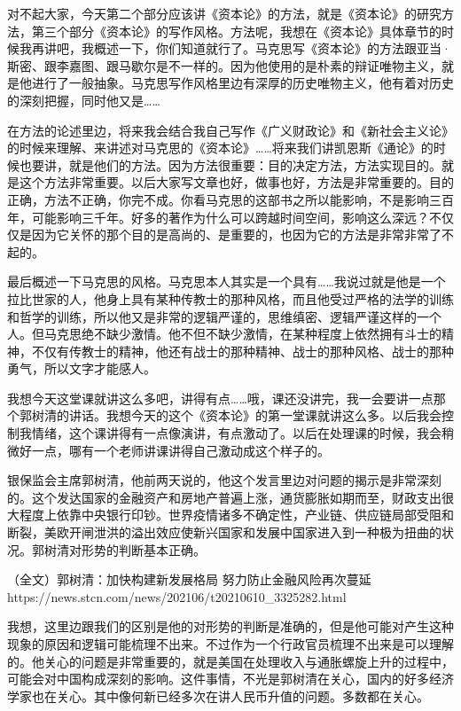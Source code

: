 \documentclass[UTF8, 12pt, a4paper]{ctexrep}
\begin{document}
对不起大家，今天第二个部分应该讲《资本论》的方法，就是《资本论》的研究方法，第三个部分《资本论》的写作风格。方法呢，我想在《资本论》具体章节的时候我再讲吧，我概述一下，你们知道就行了。马克思写《资本论》的方法跟亚当·斯密、跟李嘉图、跟马歇尔是不一样的。因为他使用的是朴素的辩证唯物主义，就是他进行了一般抽象。马克思写作风格里边有深厚的历史唯物主义，他有着对历史的深刻把握，同时他又是……

在方法的论述里边，将来我会结合我自己写作《广义财政论》和《新社会主义论》的时候来理解、来讲述对马克思的《资本论》……将来我们讲凯恩斯《通论》的时候也要讲，就是他们的方法。因为方法很重要：目的决定方法，方法实现目的。就是这个方法非常重要。以后大家写文章也好，做事也好，方法是非常重要的。目的正确，方法不正确，你完不成。你看马克思的这部书之所以能影响，不是影响三百年，可能影响三千年。好多的著作为什么可以跨越时间空间，影响这么深远？不仅仅是因为它关怀的那个目的是高尚的、是重要的，也因为它的方法是非常非常了不起的。

最后概述一下马克思的风格。马克思本人其实是一个具有……我说过就是他是一个拉比世家的人，他身上具有某种传教士的那种风格，而且他受过严格的法学的训练和哲学的训练，所以他又是非常的逻辑严谨的，思维缜密、逻辑严谨这样的一个人。但马克思绝不缺少激情。他不但不缺少激情，在某种程度上依然拥有斗士的精神，不仅有传教士的精神，他还有战士的那种精神、战士的那种风格、战士的那种勇气，所以文字才能感人。

我想今天这堂课就讲这么多吧，讲得有点……哦，课还没讲完，我一会要讲一点那个郭树清的讲话。我想今天的这个《资本论》的第一堂课就讲这么多。以后我会控制我情绪，这个课讲得有一点像演讲，有点激动了。以后在处理课的时候，我会稍微好一点，哪有一个老师讲课讲得自己激动成这个样子的。

银保监会主席郭树清，他前两天说的，他这个发言里边对问题的揭示是非常深刻的。这个发达国家的金融资产和房地产普遍上涨，通货膨胀如期而至，财政支出很大程度上依靠中央银行印钞。世界疫情诸多不确定性，产业链、供应链局部受阻和断裂，美欧开闸泄洪的溢出效应使新兴国家和发展中国家进入到一种极为扭曲的状况。郭树清对形势的判断基本正确。

（全文）郭树清：加快构建新发展格局 努力防止金融风险再次蔓延 https://news.stcn.com/news/202106/t20210610\_3325282.html

我想，这里边跟我们的区别是他的对形势的判断是准确的，但是他可能对产生这种现象的原因和逻辑可能梳理不出来。不过作为一个行政官员梳理不出来是可以理解的。他关心的问题是非常重要的，就是美国在处理收入与通胀螺旋上升的过程中，可能会对中国构成深刻的影响。这件事情，不光是郭树清在关心，国内的好多经济学家也在关心。其中像何新已经多次在讲人民币升值的问题。多数都在关心。
\end{document}
